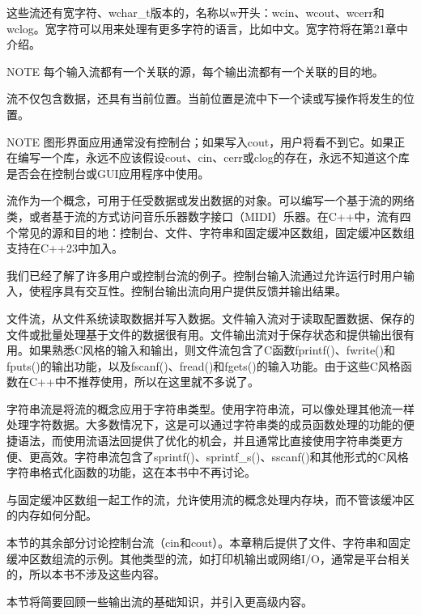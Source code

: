 这些流还有宽字符、wchar\_t版本的，名称以w开头：wcin、wcout、wcerr和wclog。宽字符可以用来处理有更多字符的语言，比如中文。宽字符将在第21章中介绍。

\begin{myNotic}{NOTE}
每个输入流都有一个关联的源，每个输出流都有一个关联的目的地。
\end{myNotic}

流不仅包含数据，还具有当前位置。当前位置是流中下一个读或写操作将发生的位置。

\begin{myNotic}{NOTE}
图形界面应用通常没有控制台；如果写入cout，用户将看不到它。如果正在编写一个库，永远不应该假设cout、cin、cerr或clog的存在，永远不知道这个库是否会在控制台或GUI应用程序中使用。
\end{myNotic}


流作为一个概念，可用于任受数据或发出数据的对象。可以编写一个基于流的网络类，或者基于流的方式访问音乐乐器数字接口（MIDI）乐器。在C++中，流有四个常见的源和目的地：控制台、文件、字符串和固定缓冲区数组，固定缓冲区数组支持在C++23中加入。

我们已经了解了许多用户或控制台流的例子。控制台输入流通过允许运行时用户输入，使程序具有交互性。控制台输出流向用户提供反馈并输出结果。

文件流，从文件系统读取数据并写入数据。文件输入流对于读取配置数据、保存的文件或批量处理基于文件的数据很有用。文件输出流对于保存状态和提供输出很有用。如果熟悉C风格的输入和输出，则文件流包含了C函数fprintf()、fwrite()和fputs()的输出功能，以及fscanf()、fread()和fgets()的输入功能。由于这些C风格函数在C++中不推荐使用，所以在这里就不多说了。

字符串流是将流的概念应用于字符串类型。使用字符串流，可以像处理其他流一样处理字符数据。大多数情况下，这是可以通过字符串类的成员函数处理的功能的便捷语法，而使用流语法回提供了优化的机会，并且通常比直接使用字符串类更方便、更高效。字符串流包含了sprintf()、sprintf\_s()、sscanf()和其他形式的C风格字符串格式化函数的功能，这在本书中不再讨论。

与固定缓冲区数组一起工作的流，允许使用流的概念处理内存块，而不管该缓冲区的内存如何分配。

本节的其余部分讨论控制台流（cin和cout）。本章稍后提供了文件、字符串和固定缓冲区数组流的示例。其他类型的流，如打印机输出或网络I/O，通常是平台相关的，所以本书不涉及这些内容。


本节将简要回顾一些输出流的基础知识，并引入更高级内容。

